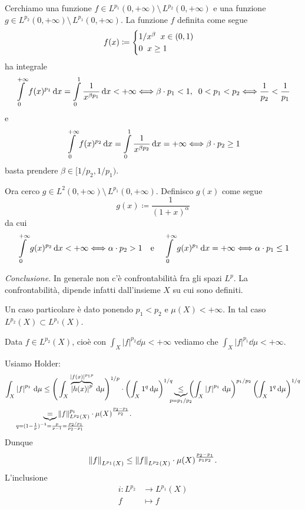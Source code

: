 \documentclass[a4paper, 12pt]{report}
\begin{document}
Cerchiamo una funzione $f \in L^{p_1}(0,+\infty) \setminus \, L^{p_2}(0,+\infty)$ e una funzione $g \in L^{p_2}(0,+\infty) \setminus \, L^{p_1}(0,+\infty)$.
La funzione $f$ definita come segue
%
$$
f(x) \coloneqq 
\begin{cases}
1 / x^\beta \;\; x \in (0,1) \\
0 \;\; x \geq 1
\end{cases} 
$$
%
ha integrale 
%
$$
\int\limits_{\mathclap{0}}^{+\infty} f(x)^{p_1} \dd x = \int\limits_{\mathclap{0}}^{1} \frac{1}{x^{\beta p_1}} \dd x < +\infty \longiff \beta \cdot p_1 < 1, \mquad 0 < p_1 < p_2 \longiff \frac{1}{p_2} < \frac{1}{p_1}
$$
e
$$
\int\limits_{\mathclap{0}}^{+\infty} f(x)^{p_2} \dd x = \int\limits_{\mathclap{0}}^{1} \frac{1}{x^{\beta p_2}} \dd x = +\infty \longiff \beta \cdot p_2 \geq 1
$$
%
basta prendere $\beta \in [1/p_2, 1/p_1)$.

Ora cerco $g \in L^2 (0,+\infty) \setminus \, L^{p_1}(0,+\infty)$.
Definisco $g(x)$ come segue
$$
g(x) \coloneqq \frac{1}{(1+x)^\alpha}
$$
da cui
$$
\int\limits_{\mathclap{0}}^{+\infty} g(x)^{p_2} \dd x < +\infty \longiff \alpha \cdot p_2 > 1
\quad
\text{e}
\quad
\int\limits_{\mathclap{0}}^{+\infty} g(x)^{p_1} \dd x = +\infty \longiff \alpha \cdot p_1 \leq 1
$$

\textit{Conclusione.} In generale non c'è confrontabilità fra gli spazi $L^p$. La confrontabilità, dipende infatti dall'insieme $X$ su cui sono definiti.

Un caso particolare è dato ponendo $p_1 < p_2$ e $\mu(X) < +\infty$. In tal caso $L^{p_2}(X) \subset L^{p_1}(X) $.

Data $f \in L^{p_2}(X)$, cioè con $\int_X \left| f \right|^{p_2} \dd \mu < +\infty$ vediamo che  $\int_X \left| f \right|^{p_1} \dd \mu < +\infty$.

Usiamo Holder:
\begin{align*}
\int_{X} \left| f \right|^{p_1} \dd \mu & \leq \Bigg( \int_{X} \overbrace{\left| h(x) \right|^p}^{\left| f(x) \right|^{p_1 p}}  \dd \mu  \Bigg)^{1/p} \cdot \left( \int_{X} 1^q \dd \mu  \right)^{1/q}
\underbrace{\leq}_{\mathclap{p = p_1 / p_2}} \left( \int_{X} \left| f \right|^{p_1} \dd \mu  \right)^{p_1 /p_2} \left( \int_{X} 1^q \dd \mu  \right)^{1/q} \\
& \underbrace{=}_{\mathclap{q = (1 - \frac{1}{p})^{-1} = \frac{p}{p-1} = \frac{p_2 / p_1}{p_2 - p_1}}} \norm{f}_{L^{p_2}(X)}^{p_1} \cdot \mu(X)^{\frac{p_2 - p_1}{p_2}}.
\end{align*}
Dunque
$$
\left\lVert f \right\rVert_{L^{p_1}(X)} \leq \left\lVert f \right\rVert_{L^{p_2}(X)}\cdot \mu(X)^{\frac{p_2 - p_1}{p_1 p_2}}.
$$
%
L'inclusione
%
\begin{align*}
i \colon L^{p_2} & \to L^{p_1}(X) \\
f & \mapsto f
\end{align*}
\end{document}
